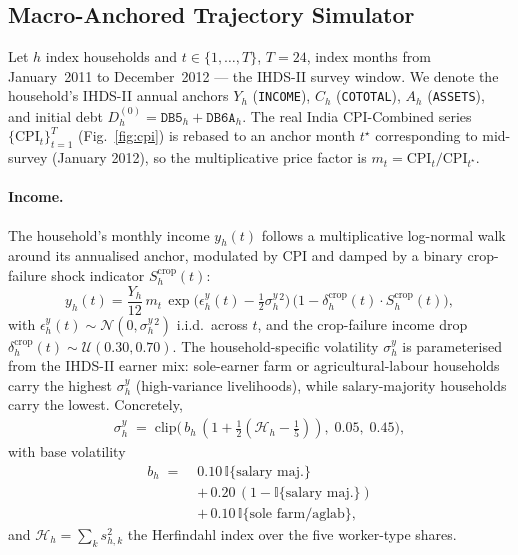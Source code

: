 \documentclass[colorlinks,balance]{asmeconf}
\begin{document}
\subsection{Macro-Anchored Trajectory Simulator}\label{sec:ew:sim}
Let $h$ index households and $t \in \{1, \ldots, T\}$, $T = 24$, index months from January~2011 to December~2012 --- the IHDS-II survey window. We denote the household's IHDS-II annual anchors $Y_h$ (\texttt{INCOME}), $C_h$ (\texttt{COTOTAL}), $A_h$ (\texttt{ASSETS}), and initial debt $D_h^{(0)} = \texttt{DB5}_h + \texttt{DB6A}_h$. The real India CPI-Combined series $\{\mathrm{CPI}_t\}_{t=1}^{T}$ (Fig.~\ref{fig:cpi}) is rebased to an anchor month $t^\star$ corresponding to mid-survey (January 2012), so the multiplicative price factor is $m_t \!=\! \mathrm{CPI}_t / \mathrm{CPI}_{t^\star}$.

\paragraph{Income.} The household's monthly income $y_h(t)$ follows a multiplicative log-normal walk around its annualised anchor, modulated by CPI and damped by a binary crop-failure shock indicator $S^{\text{crop}}_h(t)$:
\begin{equation}\label{eq:y}
    y_h(t) = \frac{Y_h}{12}\, m_t \, \exp\!\Big(\epsilon^y_h(t) - \tfrac{1}{2}\sigma^{y}_{h}{}^{2}\Big)\,\big(1 - \delta^{\text{crop}}_h(t) \cdot S^{\text{crop}}_h(t)\big),
\end{equation}
with $\epsilon^y_h(t) \!\sim\! \mathcal{N}(0, \sigma^y_h{}^2)$ i.i.d.\ across $t$, and the crop-failure income drop $\delta^{\text{crop}}_h(t) \!\sim\! \mathcal{U}(0.30, 0.70)$. The household-specific volatility $\sigma^y_h$ is parameterised from the IHDS-II earner mix: sole-earner farm or agricultural-labour households carry the highest $\sigma^y_h$ (high-variance livelihoods), while salary-majority households carry the lowest. Concretely,
\begin{equation}\label{eq:sigmay}
\begin{aligned}
\sigma^y_h \;=\; \mathrm{clip}\big(\, b_h\, (1 \!+\! \tfrac{1}{2}(\mathcal{H}_h \!-\! \tfrac{1}{5})),\; 0.05,\; 0.45 \big),
\end{aligned}
\end{equation}
with base volatility
\begin{equation}\label{eq:basevol}
\begin{aligned}
b_h \;=\;& 0.10\,\mathbb{I}\{\text{salary maj.}\} \\
        &+\, 0.20\,(1\!-\!\mathbb{I}\{\text{salary maj.}\}) \\
        &+\, 0.10\,\mathbb{I}\{\text{sole farm/aglab}\},
\end{aligned}
\end{equation}
and $\mathcal{H}_h \!=\! \sum_k s_{h,k}^2$ the Herfindahl index over the five worker-type shares.
\end{document}
